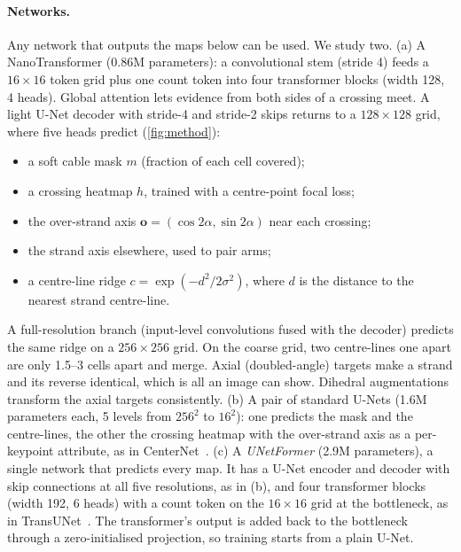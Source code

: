 \paragraph{Networks.} Any network that outputs the maps below can be used. We study two.
(a) A NanoTransformer (0.86M parameters): a convolutional stem (stride 4) feeds a $16\times16$ token grid plus
one count token into four transformer blocks (width 128, 4 heads). Global attention
lets evidence from both sides of a crossing meet. A light U-Net decoder with
stride-4 and stride-2 skips returns to a $128\times128$ grid, where five heads predict
(\cref{fig:method}):
\begin{itemize}
\item a soft cable mask $m$ (fraction of each cell covered);
\item a crossing heatmap $h$, trained with a centre-point focal loss;
\item the over-strand axis $\mathbf{o}=(\cos2\alpha,\sin2\alpha)$ near each crossing;
\item the strand axis elsewhere, used to pair arms;
\item a centre-line ridge $c=\exp(-d^2/2\sigma^2)$, where $d$ is the distance to the
  nearest strand centre-line.
\end{itemize}
A full-resolution branch (input-level convolutions fused with the decoder) predicts
the same ridge on a $256\times256$ grid. On the coarse grid, two centre-lines one
\cw{} apart are only 1.5--3 cells apart and merge. Axial (doubled-angle) targets make
a strand and its reverse identical, which is all an image can show. Dihedral
augmentations transform the axial targets consistently. (b) A pair of standard U-Nets
(1.6M parameters each, 5 levels from $256^2$ to $16^2$): one predicts the mask and the
centre-lines, the other the crossing heatmap with the over-strand axis as a per-keypoint
attribute, as in CenterNet~\cite{zhou2019objects}. (c) A \emph{UNetFormer} (2.9M parameters), a single
network that predicts every map. It has a U-Net encoder and decoder with skip connections at all five
resolutions, as in (b), and four transformer blocks (width 192, 6 heads) with a count token on the
$16\times16$ grid at the bottleneck, as in TransUNet~\cite{chen2021transunet}. The transformer's output
is added back to the bottleneck through a zero-initialised projection, so training starts from a
plain U-Net.


